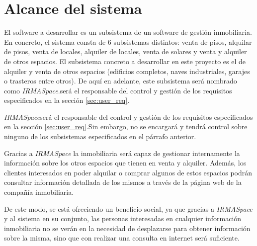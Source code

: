 \section{Alcance del sistema}\label{sec:scope}
\par El software a desarrollar es un subsistema de un software de gestión inmobiliaria. En concreto, el sistema consta de 6 subsistemas distintos: venta de pisos, alquilar de pisos, venta de locales, alquiler de locales, venta de solares y venta y alquiler de otros espacios. El subsistema concreto a desarrollar en este proyecto es el de alquiler y venta de otros espacios (edificios completos, naves industriales, garajes o trasteros entre otros). De aquí en adelante, este subsistema será nombrado como \textit{IRMASpace}.será el responsable del control y gestión de los requisitos especificados en la sección \ref{sec:user_req}.

\par \textit{IRMASpace}será el responsable del control y gestión de los requisitos especificados en la sección \ref{sec:user_req}.Sin embargo, no se encargará y tendrá control sobre ninguno de los subsistemas especificados en el párrafo anterior.

\par Gracias a \textit{IRMASpace} la inmobiliaria será capaz de gestionar internamente la información sobre los otros espacios que tienen en venta y alquiler. Además, los clientes interesados en poder alquilar o comprar algunos de estos espacios podrán consultar información detallada de los mismos a través de la página web de la compañía inmobiliaria.

\par De este modo, se está ofreciendo un beneficio social, ya que gracias a \textit{IRMASpace} y al sistema en su conjunto, las personas interesadas en cualquier información inmobiliaria no se verán en la necesidad de desplazarse para obtener información sobre la misma, sino que con realizar una consulta en internet será suficiente.
